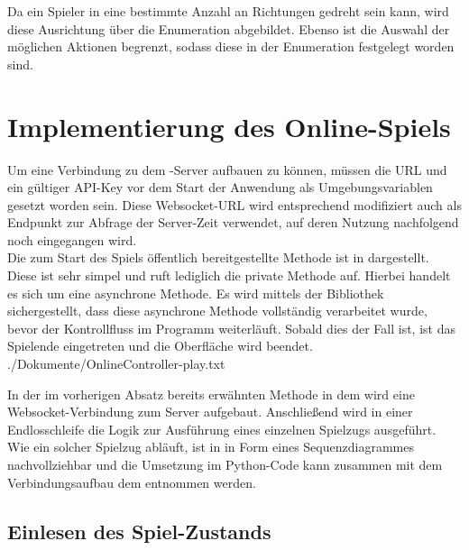 Da ein Spieler in eine bestimmte Anzahl an Richtungen gedreht sein kann, wird diese Ausrichtung über die Enumeration
 abgebildet.
Ebenso ist die Auswahl der möglichen Aktionen begrenzt, sodass diese in der Enumeration  festgelegt
worden sind.

\section{Implementierung des Online-Spiels}
\label{sec:online-implementierung}

Um eine Verbindung zu dem -Server aufbauen zu können, müssen die URL und ein gültiger API-Key vor dem
Start der Anwendung als Umgebungsvariablen gesetzt worden sein.
Diese Websocket-URL wird entsprechend modifiziert auch als Endpunkt zur Abfrage der Server-Zeit verwendet, auf deren
Nutzung nachfolgend noch eingegangen wird. \\

Die zum Start des Spiels öffentlich bereitgestellte Methode  ist in  dargestellt.
Diese ist sehr simpel und ruft lediglich die private Methode  auf.
Hierbei handelt es sich um eine asynchrone Methode.
Es wird mittels der Bibliothek  sichergestellt, dass diese asynchrone Methode vollständig verarbeitet
wurde, bevor der Kontrollfluss im Programm weiterläuft.
Sobald dies der Fall ist, ist das Spielende eingetreten und die Oberfläche wird beendet. \\


{./Dokumente/OnlineController-play.txt}

In der im vorherigen Absatz bereits erwähnten Methode  in dem  wird eine
Websocket-Verbindung zum Server aufgebaut.
Anschließend wird in einer Endlosschleife die Logik zur Ausführung eines einzelnen Spielzugs ausgeführt.
Wie ein solcher Spielzug abläuft, ist in  in Form eines Sequenzdiagrammes
nachvollziehbar und die Umsetzung im Python-Code kann zusammen mit dem Verbindungsaufbau dem 
entnommen werden.

\subsection{Einlesen des Spiel-Zustands}
\label{subsec:einlesen-spielzustand}

